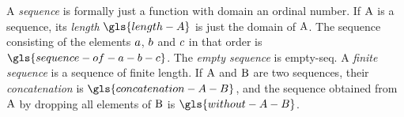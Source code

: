 
A \emph{sequence} is formally just a function with domain an ordinal number.
If $\mathrm{A}$ is a sequence, its \emph{length} $\gls{length-A}$ is just the domain
of $\mathrm{A}$.
The sequence consisting of the elements $a$, $b$ and $c$ in that order is
$\gls{sequence-of-a-b-c}$.
The \emph{empty sequence} is \gls{empty-seq}.
A \emph{finite sequence} is a sequence of finite length.
If $\mathrm{A}$ and $\mathrm{B}$ are two sequences, their \emph{concatenation}
is $\gls{concatenation-A-B}$, and the sequence obtained from $\mathrm{A}$ by
dropping all elements of $\mathrm{B}$ is $\gls{without-A-B}$.